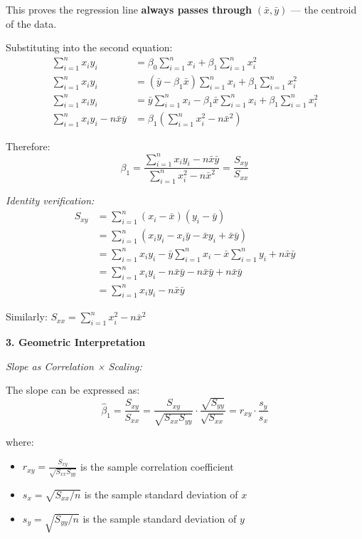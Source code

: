 \documentclass[12pt]{article}
\begin{document}
\begin{explanation}
This proves the regression line \textbf{always passes through} $(\bar{x}, \bar{y})$ — the centroid of the data.

Substituting into the second equation:
\begin{align*}
\sum_{i=1}^{n} x_i y_i &= \beta_0 \sum_{i=1}^{n} x_i + \beta_1 \sum_{i=1}^{n} x_i^2 \\
\sum_{i=1}^{n} x_i y_i &= (\bar{y} - \beta_1\bar{x}) \sum_{i=1}^{n} x_i + \beta_1 \sum_{i=1}^{n} x_i^2 \\
\sum_{i=1}^{n} x_i y_i &= \bar{y}\sum_{i=1}^{n} x_i - \beta_1\bar{x}\sum_{i=1}^{n} x_i + \beta_1 \sum_{i=1}^{n} x_i^2 \\
\sum_{i=1}^{n} x_i y_i - n\bar{x}\bar{y} &= \beta_1 \left(\sum_{i=1}^{n} x_i^2 - n\bar{x}^2\right)
\end{align*}

Therefore:
\[
\beta_1 = \frac{\sum_{i=1}^{n} x_i y_i - n\bar{x}\bar{y}}{\sum_{i=1}^{n} x_i^2 - n\bar{x}^2} = \frac{S_{xy}}{S_{xx}}
\]

\textit{Identity verification:}
\begin{align*}
S_{xy} &= \sum_{i=1}^{n}(x_i - \bar{x})(y_i - \bar{y}) \\
&= \sum_{i=1}^{n}(x_i y_i - x_i\bar{y} - \bar{x}y_i + \bar{x}\bar{y}) \\
&= \sum_{i=1}^{n} x_i y_i - \bar{y}\sum_{i=1}^{n}x_i - \bar{x}\sum_{i=1}^{n}y_i + n\bar{x}\bar{y} \\
&= \sum_{i=1}^{n} x_i y_i - n\bar{x}\bar{y} - n\bar{x}\bar{y} + n\bar{x}\bar{y} \\
&= \sum_{i=1}^{n} x_i y_i - n\bar{x}\bar{y}
\end{align*}

Similarly: $S_{xx} = \sum_{i=1}^{n} x_i^2 - n\bar{x}^2$

\textbf{3. Geometric Interpretation}

\textit{Slope as Correlation × Scaling:}

The slope can be expressed as:
\[
\hat{\beta}_1 = \frac{S_{xy}}{S_{xx}} = \frac{S_{xy}}{\sqrt{S_{xx}S_{yy}}} \cdot \frac{\sqrt{S_{yy}}}{\sqrt{S_{xx}}} = r_{xy} \cdot \frac{s_y}{s_x}
\]

where:
\begin{itemize}
    \item $r_{xy} = \frac{S_{xy}}{\sqrt{S_{xx}S_{yy}}}$ is the sample correlation coefficient
    \item $s_x = \sqrt{S_{xx}/n}$ is the sample standard deviation of $x$
    \item $s_y = \sqrt{S_{yy}/n}$ is the sample standard deviation of $y$
\end{itemize}


\end{explanation}
\end{document}
